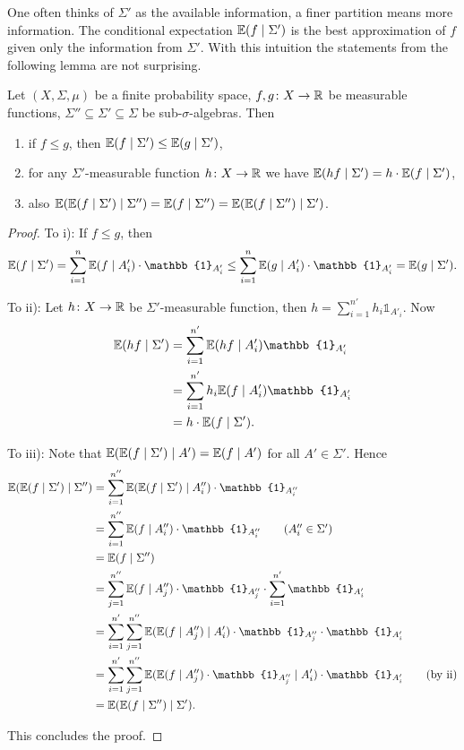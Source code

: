 
One often thinks of $\Sigma'$ as the available information, a finer partition means more information. The conditional expectation $\mathbb{E}(f\mid \Sigma')$ is the best approximation of $f$ given only the information from $\Sigma'$. 
With this intuition the statements from the following lemma are not surprising. 
\begin{lemma}\label{lem:condExp}
Let $(X,\Sigma,\mu)$ be a finite probability space, $f,g\colon X\to \mathbb{R}$ be measurable functions, $\Sigma''\subseteq\Sigma'\subseteq\Sigma$ be sub-$\sigma$-algebras. Then
\begin{enumerate}[label=\roman*)]
\item if $f\leq g$, then $\mathbb{E}(f\mid \Sigma')\leq\mathbb{E}(g\mid \Sigma')$,
\item for any $\Sigma'$-measurable function $h\colon X\to\mathbb{R}$ we have $\mathbb{E}(h f\mid\Sigma')=h\cdot\mathbb{E}(f\mid\Sigma')$,
\item also $\mathbb{E}(\mathbb{E}(f\mid \Sigma')\mid\Sigma'')=\mathbb{E}(f\mid\Sigma'')=\mathbb{E}(\mathbb{E}(f\mid \Sigma'')\mid\Sigma')$.
\end{enumerate}
\end{lemma}
\begin{proof}
To i): If $f\leq g$, then
\[\E(f\mid \Sigma')=\sum_{i=1}^n\E(f\mid A'_i)\cdot \mathbb{1}_{A'_i}\leq \sum_{i=1}^n\E(g\mid A'_i)\cdot \mathbb{1}_{A'_i}=\E(g\mid \Sigma').\]


To ii): Let $h\colon X\to\mathbb{R}$ be $\Sigma'$-measurable function, then $h=\sum_{i=1}^{n'}h_i\mathbb{1}_{A'_i}$. Now 
\begin{align*}
\E(h f\mid\Sigma')&=\sum_{i=1}^{n'}\E(hf\mid A'_i)\mathbb{1}_{A'_i}\\
&=\sum_{i=1}^{n'}h_i\E(f\mid A'_i)\mathbb{1}_{A'_i}\\
&=h\cdot\E(f\mid\Sigma').
\end{align*}

To iii): Note that $\mathbb{E}(\mathbb{E}(f\mid \Sigma')\mid A')=\mathbb{E}(f\mid A')$ for all $A'\in\Sigma'$. Hence
\begin{align*}
\E(\E(f\mid \Sigma')\mid\Sigma'')&=\sum_{i=1}^{n''}\E(\E(f\mid \Sigma')\mid A''_i)\cdot\mathbb{1}_{A''_i}\\
&=\sum_{i=1}^{n''}\E(f\mid A''_i)\cdot\mathbb{1}_{A''_i}\tag{$A''_i\in\Sigma'$}\\
&=\E(f\mid\Sigma'')\\
&=\sum_{j=1}^{n''}\E(f\mid A''_j)\cdot\mathbb{1}_{A''_j}\cdot\sum_{i=1}^{n'}\mathbb{1}_{A'_i}\\
&=\sum_{i=1}^{n'}\sum_{j=1}^{n''}\E(\E(f\mid A''_j)\mid A'_i)\cdot\mathbb{1}_{A''_j}\cdot\mathbb{1}_{A'_i}\\
&=\sum_{i=1}^{n'}\sum_{j=1}^{n''}\E(\E(f\mid A''_j)\cdot\mathbb{1}_{A''_j}\mid A'_i)\cdot\mathbb{1}_{A'_i}\tag{by ii}\\
&=\E(\E(f\mid \Sigma'')\mid\Sigma').
\end{align*}


This concludes the proof.
\end{proof}


